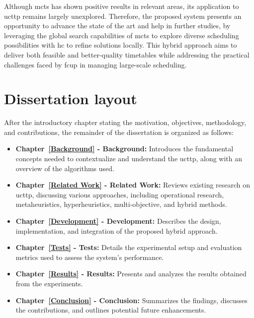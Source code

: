 Although \ac{mcts} has shown positive results in relevant areas, its application to \ac{ucttp} remains largely unexplored. Therefore, the proposed system presents an opportunity to advance the state of the art and help in further studies, by leveraging the global search capabilities of \ac{mcts} to explore diverse scheduling possibilities with \ac{hc} to refine solutions locally. This hybrid approach aims to deliver both feasible and better-quality timetables while addressing the practical challenges faced by \ac{fcup} in managing large-scale scheduling.

\section{Dissertation layout}

After the introductory chapter stating the motivation, objectives, methodology, and contributions, the remainder of the dissertation is organized as follows:

\begin{itemize}
\item \textbf{Chapter~\ref{Background} - Background:} Introduces the fundamental concepts needed to contextualize and understand the \ac{ucttp}, along with an overview of the algorithms used.
\item \textbf{Chapter~\ref{Related Work} -  Related Work:} Reviews existing research on \ac{ucttp}, discussing various approaches, including operational research, metaheuristics, hyperheuristics, multi-objective, and hybrid methods.
\item \textbf{Chapter~\ref{Development} -  Development:} Describes the design, implementation, and integration of the proposed hybrid approach.
\item \textbf{Chapter~\ref{Tests} - Tests:} Details the experimental setup and evaluation metrics used to assess the system's performance.
\item \textbf{Chapter~\ref{Results} -  Results:} Presents and analyzes the results obtained from the experiments. 
\item \textbf{Chapter~\ref{Conclusion} - Conclusion:} Summarizes the findings, discusses the contributions, and outlines potential future enhancements.
\end{itemize}


